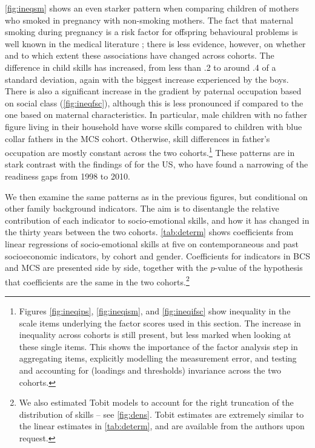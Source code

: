 \autoref{fig:ineqsm} shows an even starker pattern when comparing children of mothers who smoked in pregnancy with non-smoking mothers. The fact that maternal smoking during pregnancy is a risk factor for offspring behavioural problems is well known in the medical literature \citep{Gaysina2013}; there is less evidence, however, on whether and to which extent these associations have changed across cohorts. The difference in child skills has increased, from less than .2 to around .4 of a standard deviation, again with the biggest increase experienced by the boys. There is also a significant increase in the gradient by paternal occupation based on social class (\autoref{fig:ineqfsc}), although this is less pronounced if compared to the one based on maternal characteristics. In particular, male children with no father figure living in their household have worse skills compared to children with blue collar fathers in the MCS cohort. Otherwise, skill differences in father's occupation are mostly constant across the two cohorts.\footnote{Figures \ref{fig:ineqips}, \ref{fig:ineqism}, and \ref{fig:ineqifsc} show inequality in the scale items underlying the factor scores used in this section. The increase in inequality across cohorts is still present, but less marked when looking at these single items. This shows the importance of the factor analysis step in aggregating items, explicitly modelling the measurement error, and testing and accounting for (loadings and thresholds) invariance across the two cohorts.} These patterns are in stark contrast with the findings of \citet{Reardon2016} for the US, who have found a narrowing of the readiness gaps from 1998 to 2010.

We then examine the same patterns as in the previous figures, but conditional on other family background indicators. The aim is to disentangle the relative contribution of each indicator to socio-emotional skills, and how it has changed in the thirty years between the two cohorts. \autoref{tab:determ} shows coefficients from linear regressions of socio-emotional skills at five on contemporaneous and past socioeconomic indicators, by cohort and gender. Coefficients for indicators in BCS and MCS are presented side by side, together with the $p$-value of the hypothesis that coefficients are the same in the two cohorts.\footnote{We also estimated Tobit models to account for the right truncation of the distribution of skills -- see \autoref{fig:dens}. Tobit estimates are extremely similar to the linear estimates in \autoref{tab:determ}, and are available from the authors upon request.}

